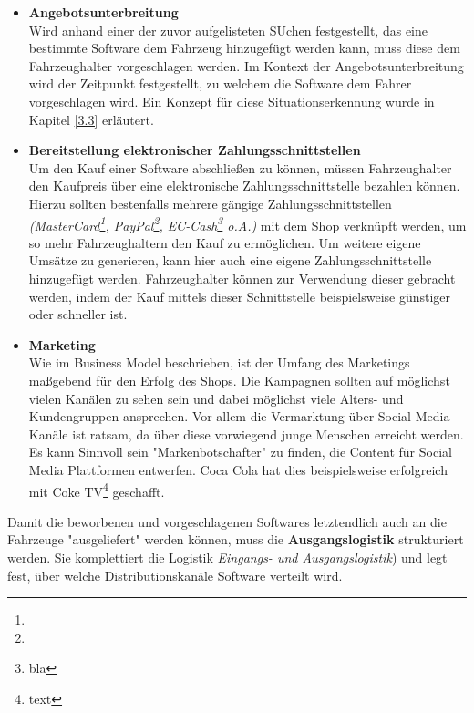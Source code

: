 \begin{itemize}
	\item[] \hspace{-0.6cm} \textbf{Angebotsunterbreitung}\\
	Wird anhand einer der zuvor aufgelisteten SUchen festgestellt, das eine bestimmte Software dem Fahrzeug hinzugefügt werden kann, muss diese dem Fahrzeughalter vorgeschlagen werden. Im Kontext der Angebotsunterbreitung wird der Zeitpunkt festgestellt, zu welchem die Software dem Fahrer vorgeschlagen wird. Ein Konzept für diese Situationserkennung wurde in Kapitel \ref{3.3} erläutert.
	
	\item[] \hspace{-0.6cm} \textbf{Bereitstellung elektronischer Zahlungsschnittstellen}\\
	Um den Kauf einer Software abschließen zu können, müssen Fahrzeughalter den Kaufpreis über eine elektronische Zahlungsschnittstelle bezahlen können. Hierzu sollten bestenfalls mehrere gängige Zahlungsschnittstellen \textit{(MasterCard\footnote{}, PayPal\footnote{}, EC-Cash\footnote{bla} o.A.)} mit dem Shop verknüpft werden, um so mehr Fahrzeughaltern den Kauf zu ermöglichen. Um weitere eigene Umsätze zu generieren, kann hier auch eine eigene Zahlungsschnittstelle hinzugefügt werden. Fahrzeughalter können zur Verwendung dieser gebracht werden, indem der Kauf mittels dieser Schnittstelle beispielsweise günstiger oder schneller ist.
	
	\item[] \hspace{-0.6cm} \textbf{Marketing}\\
	Wie im Business Model beschrieben, ist der Umfang des Marketings maßgebend für den Erfolg des Shops. Die Kampagnen sollten auf möglichst vielen Kanälen zu sehen sein und dabei möglichst viele Alters- und Kundengruppen ansprechen. Vor allem die Vermarktung über Social Media Kanäle ist ratsam, da über diese vorwiegend junge Menschen erreicht werden. Es kann Sinnvoll sein "Markenbotschafter" zu finden, die Content für Social Media Plattformen entwerfen. Coca Cola hat dies beispielsweise erfolgreich mit Coke TV\footnote{text} geschafft.
\end{itemize}
Damit die beworbenen und vorgeschlagenen Softwares letztendlich auch an die Fahrzeuge "ausgeliefert" werden können, muss die \textbf{Ausgangslogistik} strukturiert werden. Sie komplettiert die Logistik \textit{Eingangs- und Ausgangslogistik}) und legt fest, über welche Distributionskanäle Software verteilt wird.
